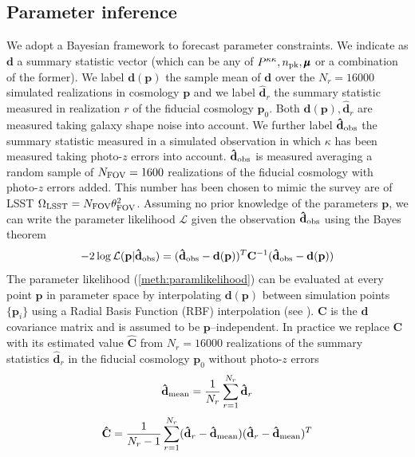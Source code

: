 \documentclass[reprint,aps,prd,superscriptaddress,showkeys,showpacs]{revtex4-1}
\newcommand{\bb}[1]{\mathbf{#1}}
\newcommand{\bbh}[1]{\mathbf{\hat{#1}}}
\begin{document}

\subsection{Parameter inference}
We adopt a Bayesian framework to forecast parameter constraints. We indicate as $\bb{d}$ a summary statistic vector (which can be any of $P^{\kappa\kappa},n_{\rm pk},\pmb{\mu}$ or a combination of the former). We label $\bb{d}(\bb{p})$ the sample mean of $\bb{d}$ over the $N_r=16000$ simulated realizations in cosmology $\bb{p}$ and we label $\bbh{d}_r$ the summary statistic measured in realization $r$ of the fiducial cosmology $\bb{p}_0$. Both $\bb{d}(\bb{p}),\bbh{d}_r$ are measured taking galaxy shape noise into account. We further label $\bbh{d}_{\rm obs}$ the summary statistic measured in a simulated observation in which $\kappa$ has been measured taking photo-$z$ errors into account. $\bbh{d}_{\rm obs}$ is measured averaging a random sample of $N_{\rm FOV}=1600$ realizations of the fiducial cosmology with photo-$z$ errors added. This number has been chosen to mimic the survey are of LSST $\Omega_{\rm LSST}=N_{\rm FOV}\theta_{\rm FOV}^2$. Assuming no prior knowledge of the parameters $\bb{p}$, we can write the parameter likelihood $\mathcal{L}$ given the observation $\bbh{d}_{\rm obs}$ using the Bayes theorem
%
\begin{equation}
\label{meth:paramlikelihood}
-2\log\mathcal{L}(\bb{p}\vert \bbh{d}_{\rm obs}) = (\bbh{d}_{\rm obs} - \bb{d}(\bb{p}))^T\bb{C}^{-1}(\bbh{d}_{\rm obs} - \bb{d}(\bb{p}))
\end{equation}  
%
The parameter likelihood (\ref{meth:paramlikelihood}) can be evaluated at every point $\bb{p}$ in parameter space by interpolating $\bb{d}(\bb{p})$ between simulation points $\{\bb{p}_i\}$ using a Radial Basis Function (RBF) interpolation (see \citep{CFHTMink,LensTools-paper}). $\bb{C}$ is the $\bb{d}$ covariance matrix and is assumed to be $\bb{p}$--independent. In practice we replace $\bb{C}$ with its estimated value $\bbh{C}$ from $N_r=16000$ realizations of the summary statistics $\bbh{d}_r$ in the fiducial cosmology $\bb{p}_0$ without photo-$z$ errors
%
\begin{equation}
\bbh{d}_{\rm mean} = \frac{1}{N_r}\sum_{r=1}^{N_r}\bbh{d}_r 
\end{equation}
%
\begin{equation}
\bbh{C} = \frac{1}{N_r-1}\sum_{r=1}^{N_r} (\bbh{d}_r-\bbh{d}_{\rm mean})(\bbh{d}_r-\bbh{d}_{\rm mean})^T
\end{equation} 
\end{document}
